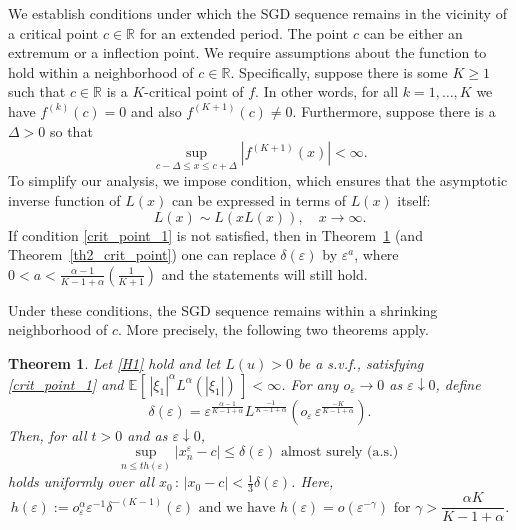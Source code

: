 \documentclass{article}
\theoremstyle{plain}
\newtheorem{theorem}{Theorem}[section]
\theoremstyle{definition}
\theoremstyle{remark}
\newcommand{\e}[2][]{{\mathbb{E}_{#1}\left[ \, #2 \,\right] }} %
\newcommand{\ra }{ \rightarrow} %
\begin{document}
We establish conditions under which the SGD sequence remains in the vicinity of a critical point $c \in \mathbb{R}$ for an extended period. The point $c$ can be either an extremum or a inflection point. We  require assumptions about the function to hold within a neighborhood of $c \in \mathbb{R}$. Specifically, suppose there is some $K \geqslant 1$ such that $c \in \mathbb{R}$ is a $K$-critical point of $f$. In other words, for all $k = 1, \ldots, K$ we have $f^{(k)}(c) = 0$ and also $f^{(K+1)}(c) \neq 0$. Furthermore, suppose there is a $\Delta > 0$ so that
\[
\sup_{c - \Delta \leqslant x \leqslant c + \Delta} |f^{(K+1)}(x)| < \infty.
\]
To simplify our analysis, we impose condition, which ensures that the asymptotic inverse function of $L(x)$ can be expressed in terms of $L(x)$ itself:
\begin{equation}\label{crit_point_1}
    L(x) \sim L(xL(x)), \quad x \ra \infty. 
\end{equation}
If condition \eqref{crit_point_1} is not satisfied, then in Theorem~\ref{th1_crit_point} (and Theorem~\ref{th2_crit_point}) one can replace $\delta(\varepsilon)$ by $\varepsilon^{a}$, where $0 <a <  \frac{\alpha-1}{K-1+\alpha} \left(\frac{1}{K+1}\right)$ and the statements will still hold.

Under these conditions, the SGD sequence remains within a shrinking neighborhood of $c$. More precisely, the following two theorems apply.
\begin{theorem}\label{th1_crit_point}
    Let \ref{H1} hold and let $L(u) > 0$ be a s.v.f., satisfying \eqref{crit_point_1} and $\e{|\xi_1|^\alpha L^\alpha(|\xi_1|)}<\infty$. For any $o_{\varepsilon}\ra 0$ as $\varepsilon\downarrow 0$, define
    \begin{equation*}
        \delta(\varepsilon) = %
        \varepsilon^{\frac{\alpha-1}{K-1+\alpha}} L^{\frac{-1}{K-1+\alpha}}\left(o_{\varepsilon}\,\varepsilon^{\frac{-K}{K-1+\alpha}} \right).
    \end{equation*}
    Then, for all $t >0$ and as $\varepsilon\downarrow 0$,
    \begin{equation*}
        \sup\limits_{n \leqslant t h(\varepsilon)}|x^{\varepsilon}_{n} - c| \leqslant \delta(\varepsilon) \text{ almost surely (a.s.) }
    \end{equation*}
    holds uniformly over all $x_0 \,:\, |x_0 - c|< \frac{1}{3} \delta(\varepsilon)$. Here, 
    \begin{equation*}
         h(\varepsilon):= o^{\alpha}_{\varepsilon} \varepsilon^{ - 1} \delta^{- (K-1)}(\varepsilon) \text{ and we have } h(\varepsilon) = o(\varepsilon^{-\gamma}) \text{ for }  \gamma >\frac{\alpha K}{K-1+\alpha}.
    \end{equation*}
\end{theorem}
\end{document}
